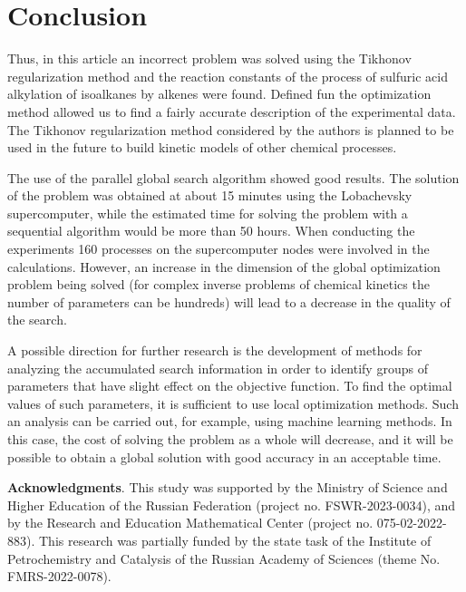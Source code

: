 \documentclass{svproc}
\begin{document}
\section{Conclusion} 

Thus, in this article an incorrect problem was solved using the Tikhonov regularization method and the reaction constants of the process of sulfuric acid alkylation of isoalkanes by alkenes were found. Defined fun the optimization method allowed us to find a fairly accurate description of the experimental data. The Tikhonov regularization method considered by the authors is planned to be used in the future to build kinetic models of other chemical processes.

The use of the parallel global search algorithm showed good results. The solution of the problem was obtained at about 15 minutes using the Lobachevsky supercomputer, while the estimated time for solving the problem with a sequential algorithm would be more than 50 hours. When conducting the experiments 160 processes on the supercomputer nodes were involved in the calculations. However, an increase in the dimension of the global optimization problem being solved (for complex inverse problems of chemical kinetics the number of parameters can be hundreds) will lead to a decrease in the quality of the search.

A possible direction for further research is the development of methods for analyzing the accumulated search information in order to identify groups of parameters that have slight effect on the objective function. To find the optimal values of such parameters, it is sufficient to use local optimization methods. Such an analysis can be carried out, for example, using machine learning methods. In this case, the cost of solving the problem as a whole will decrease, and it will be possible to obtain a global solution with good accuracy in an acceptable time.


\medskip

\textbf{Acknowledgments}. This study was supported by the Ministry of Science and Higher Education of the Russian Federation (project no. FSWR-2023-0034), and by the Research and Education Mathematical Center (project no.  075-02-2022-883). This research was partially funded by the state task of the Institute of Petrochemistry and Catalysis of the Russian Academy of Sciences (theme No. FMRS-2022-0078).



%
%

{}
\end{document}
